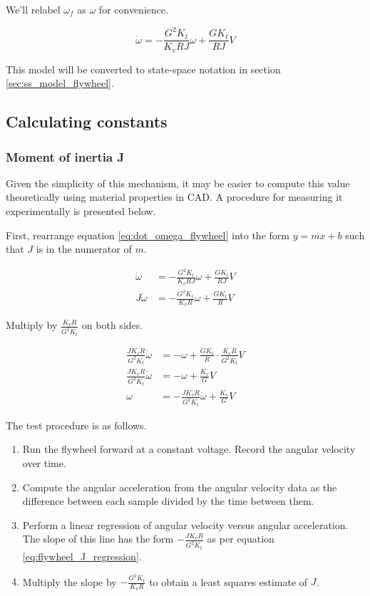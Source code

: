 We'll relabel $\omega_f$ as $\omega$ for convenience.

\begin{equation}
  \dot{\omega} = -\frac{G^2 K_t}{K_v RJ} \omega + \frac{G K_t}{RJ} V
    \label{eq:dot_omega_flywheel}
\end{equation}

This model will be converted to state-space notation in section
\ref{sec:ss_model_flywheel}.

\subsection{Calculating constants}

\subsubsection{Moment of inertia J}

Given the simplicity of this mechanism, it may be easier to compute this value
theoretically using material properties in CAD. A procedure for measuring it
experimentally is presented below.

First, rearrange equation \eqref{eq:dot_omega_flywheel} into the form
$y = mx + b$ such that $J$ is in the numerator of $m$.

\begin{align*}
  \dot{\omega} &= -\frac{G^2 K_t}{K_v RJ} \omega + \frac{G K_t}{RJ} V \\
  J\dot{\omega} &= -\frac{G^2 K_t}{K_v R} \omega + \frac{G K_t}{R} V
\end{align*}

Multiply by $\frac{K_v R}{G^2 K_t}$ on both sides.

\begin{align}
  \frac{J K_v R}{G^2 K_t} \dot{\omega} &= -\omega + \frac{G K_t}{R} \cdot
    \frac{K_v R}{G^2 K_t} V \nonumber \\
  \frac{J K_v R}{G^2 K_t} \dot{\omega} &= -\omega + \frac{K_v}{G} V \nonumber \\
  \omega &= -\frac{J K_v R}{G^2 K_t} \dot{\omega} + \frac{K_v}{G} V
    \label{eq:flywheel_J_regression}
\end{align}

The test procedure is as follows.

\begin{enumerate}
  \item Run the flywheel forward at a constant voltage. Record the angular
    velocity over time.
  \item Compute the angular acceleration from the angular velocity data as the
    difference between each sample divided by the time between them.
  \item Perform a linear regression of angular velocity versus angular
    acceleration. The slope of this line has the form $-\frac{J K_v R}{G^2 K_t}$
    as per equation \eqref{eq:flywheel_J_regression}.
  \item Multiply the slope by $-\frac{G^2 K_t}{K_v R}$ to obtain a least squares
    estimate of $J$.
\end{enumerate}

